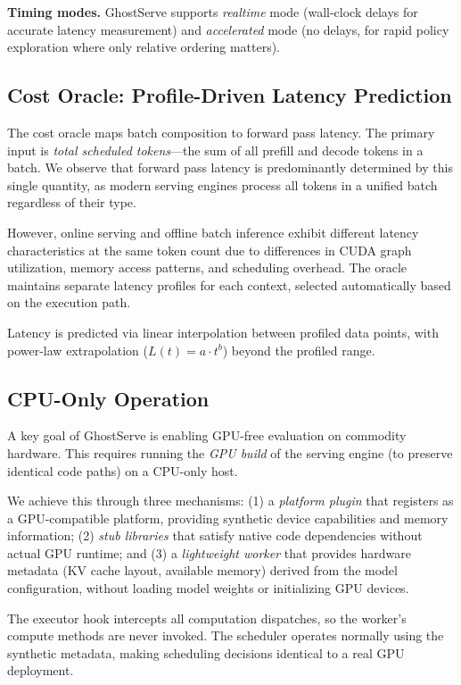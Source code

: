 \documentclass[conference]{IEEEtran}
\newcommand{\sysname}{GhostServe}
\begin{document}
\textbf{Timing modes.} \sysname{} supports \emph{realtime} mode (wall-clock delays for accurate latency measurement) and \emph{accelerated} mode (no delays, for rapid policy exploration where only relative ordering matters).

\subsection{Cost Oracle: Profile-Driven Latency Prediction}
\label{sec:oracle}

The cost oracle maps batch composition to forward pass latency. The primary input is \emph{total scheduled tokens}---the sum of all prefill and decode tokens in a batch. We observe that forward pass latency is predominantly determined by this single quantity, as modern serving engines process all tokens in a unified batch regardless of their type.

However, online serving and offline batch inference exhibit different latency characteristics at the same token count due to differences in CUDA graph utilization, memory access patterns, and scheduling overhead. The oracle maintains separate latency profiles for each context, selected automatically based on the execution path.

Latency is predicted via linear interpolation between profiled data points, with power-law extrapolation ($L(t) = a \cdot t^b$) beyond the profiled range.

\subsection{CPU-Only Operation}
\label{sec:worker}

A key goal of \sysname{} is enabling GPU-free evaluation on commodity hardware. This requires running the \emph{GPU build} of the serving engine (to preserve identical code paths) on a CPU-only host.

We achieve this through three mechanisms: (1) a \emph{platform plugin} that registers as a GPU-compatible platform, providing synthetic device capabilities and memory information; (2) \emph{stub libraries} that satisfy native code dependencies without actual GPU runtime; and (3) a \emph{lightweight worker} that provides hardware metadata (KV cache layout, available memory) derived from the model configuration, without loading model weights or initializing GPU devices.

The executor hook intercepts all computation dispatches, so the worker's compute methods are never invoked. The scheduler operates normally using the synthetic metadata, making scheduling decisions identical to a real GPU deployment.
\end{document}
